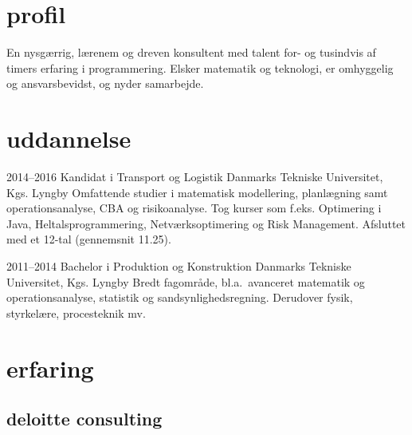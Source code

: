 \documentclass[]{../friggeri-cv} %
\begin{document}
\section{profil}
En nysgærrig, lærenem og dreven konsultent med talent for- og tusindvis af timers erfaring i programmering. Elsker matematik og teknologi, er omhyggelig og ansvarsbevidst, og nyder samarbejde. 
\section{uddannelse}
\begin{entrylist}

\entry
{2014--2016}
{Kandidat {\normalfont i Transport og Logistik}}
{Danmarks Tekniske Universitet, Kgs. Lyngby}
{Omfattende studier i matematisk modellering, planlægning samt operationsanalyse, CBA og risikoanalyse. Tog kurser som f.eks. Optimering i Java, Heltalsprogrammering, Netværksoptimering og Risk Management. Afsluttet med et 12-tal (gennemsnit 11.25).
}

\entry
{2011--2014}
{Bachelor {\normalfont i Produktion og Konstruktion}}
{Danmarks Tekniske Universitet, Kgs. Lyngby}
{Bredt fagområde, bl.a.\ avanceret matematik og operationsanalyse, statistik og sandsynlighedsregning. Derudover fysik, styrkelære, procesteknik mv.}


\end{entrylist}


\section{erfaring}

\subsection{deloitte consulting}
\end{document}
